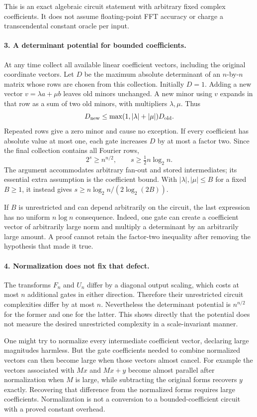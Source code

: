 \documentclass[11pt]{article}
\begin{document}
This is an exact algebraic circuit statement with arbitrary fixed complex coefficients. It does not assume floating-point FFT accuracy or charge a transcendental constant oracle per input.

\paragraph{3. A determinant potential for bounded coefficients.}
At any time collect all available linear coefficient vectors, including the original coordinate vectors. Let $D$ be the maximum absolute determinant of an $n$-by-$n$ matrix whose rows are chosen from this collection. Initially $D=1$. Adding a new vector $v=\lambda a+\mu b$ leaves old minors unchanged. A new minor using $v$ expands in that row as a sum of two old minors, with multipliers $\lambda,\mu$. Thus
\[
 D_{\rm new}\le\max(1,|\lambda|+|\mu|)D_{\rm old}.
\]
Repeated rows give a zero minor and cause no exception. If every coefficient has absolute value at most one, each gate increases $D$ by at most a factor two. Since the final collection contains all Fourier rows,
\[
 2^s\ge n^{n/2},\qquad
 s\ge\tfrac12 n\log_2n.
\]
The argument accommodates arbitrary fan-out and stored intermediates; its essential extra assumption is the coefficient bound. With $|\lambda|,|\mu|\le B$ for a fixed $B\ge1$, it instead gives $s\ge n\log_2n/(2\log_2(2B))$.

If $B$ is unrestricted and can depend arbitrarily on the circuit, the last expression has no uniform $n\log n$ consequence. Indeed, one gate can create a coefficient vector of arbitrarily large norm and multiply a determinant by an arbitrarily large amount. A proof cannot retain the factor-two inequality after removing the hypothesis that made it true.

\paragraph{4. Normalization does not fix that defect.}
The transforms $F_n$ and $U_n$ differ by a diagonal output scaling, which costs at most $n$ additional gates in either direction. Therefore their unrestricted circuit complexities differ by at most $n$. Nevertheless the determinant potential is $n^{n/2}$ for the former and one for the latter. This shows directly that the potential does not measure the desired unrestricted complexity in a scale-invariant manner.

One might try to normalize every intermediate coefficient vector, declaring large magnitudes harmless. But the gate coefficients needed to combine normalized vectors can then become large when those vectors almost cancel. For example the vectors associated with $Mx$ and $Mx+y$ become almost parallel after normalization when $M$ is large, while subtracting the original forms recovers $y$ exactly. Recovering that difference from the normalized forms requires large coefficients. Normalization is not a conversion to a bounded-coefficient circuit with a proved constant overhead.
\end{document}
